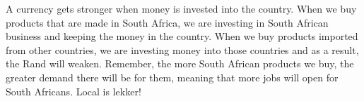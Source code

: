 A currency gets stronger when money is invested into the country. When we buy products that are made in South Africa, we are investing in South African business and keeping the money in the country. When we buy products imported from other countries, we are investing money into those countries and as a result, the Rand will weaken. Remember, the more South African products we buy, the greater demand there will be for them, meaning that more jobs will open for South Africans. Local is lekker!


\begin{wex}{Buitelandse Wisselkoerse}
    {Saba wants to travel to see family in Spain. She has been given R~$10~000$ spending money. How many Euros can she buy if the exchange rate is currently €~$1$ = R~$10,68$?}{
    
    Saba can buy €~$936,33$ with R~$10~000$.
\end{wex}


